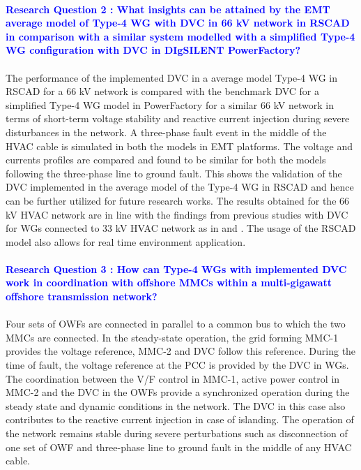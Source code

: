 \paragraph{\textcolor{blue}{Research Question 2 : What insights can be attained by the \gls{EMT} average model of Type-4 \gls{WG} with \gls{DVC} in 66 kV network in RSCAD in comparison with a similar system modelled with a simplified Type-4 \gls{WG} configuration with \gls{DVC} in DIgSILENT PowerFactory?}}

\paragraph{} The performance of the implemented \gls{DVC} in a average model Type-4 \gls{WG} in RSCAD for a 66 kV network is compared with the benchmark \gls{DVC} for a simplified Type-4 \gls{WG} model in PowerFactory for a similar 66 kV network in terms of short-term voltage stability and reactive current injection during severe disturbances in the network. A three-phase fault event in the middle of the \gls{HVAC} cable is simulated in both the models in \gls{EMT} platforms. The voltage and currents profiles are compared and found to be similar for both the models following the three-phase line to ground fault. This shows the validation of the \gls{DVC} implemented in the average model of the Type-4 \gls{WG} in RSCAD and hence can be further utilized for future research works. The results obtained for the 66 kV \gls{HVAC} network are in line with the findings from previous studies with \gls{DVC} for \gls{WG}s connected to 33 kV \gls{HVAC} network as in \cite{korai_dynamic_2019} and \cite{sethi_real-time_nodate-new}. The usage of the RSCAD model also allows for real time environment application.    

\paragraph{\textcolor{blue}{Research Question 3 : How can Type-4 \gls{WG}s with implemented \gls{DVC} work in coordination with offshore \gls{MMC}s within a multi-gigawatt offshore transmission network?}}

\paragraph{} Four sets of \gls{OWF}s are connected in parallel to a common bus to which the two \gls{MMC}s are connected. In the steady-state operation, the grid forming \gls{MMC}-1 provides the voltage reference, \gls{MMC}-2 and \gls{DVC} follow this reference. During the time of fault, the voltage reference at the \gls{PCC} is provided by the \gls{DVC} in \gls{WG}s. The coordination between the V/F control in \gls{MMC}-1, active power control in \gls{MMC}-2 and the \gls{DVC} in the \gls{OWF}s provide a synchronized operation during the steady state and dynamic conditions in the network. The \gls{DVC} in this case also contributes to the reactive current injection in case of islanding. The operation of the network remains stable during severe perturbations such as disconnection of one set of \gls{OWF} and three-phase line to ground fault in the middle of any \gls{HVAC} cable.

